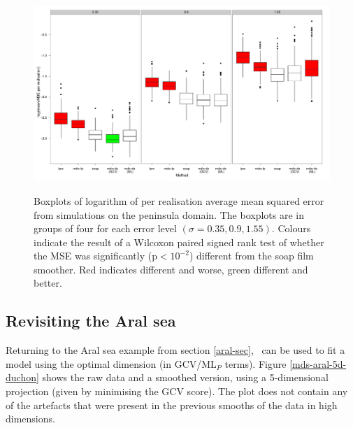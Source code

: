 \begin{figure}
\centering
\includegraphics[width=6in]{mds/figs/wt2-boxplot-duchon.pdf} \\
\caption{Boxplots of logarithm of per realisation average mean squared error from simulations on the peninsula domain. The boxplots are in groups of four for each error level $(\sigma = 0.35, 0.9, 1.55)$. Colours indicate the result of a Wilcoxon paired signed rank test of whether the MSE was significantly (p$<10^{-2}$) different from the soap film smoother. Red indicates different and worse, green different and better.}
\label{wt2-boxplot-duchon}
\end{figure}


\subsection{Revisiting the Aral sea}
\label{aral-revisit}
Returning to the Aral sea example from section \ref{aral-sec}, \mdsds\ can be used to fit a model using the optimal dimension (in GCV/$\text{ML}_P$ terms). Figure \ref{mds-aral-5d-duchon} shows the raw data and a smoothed version, using a 5-dimensional projection (given by minimising the GCV score). The plot does not contain any of the artefacts that were present in the previous smooths of the data in high dimensions.

